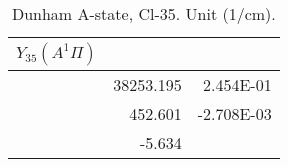 \begin{table}[h]
\begin{tabular}{crr}
\toprule
$Y_{35} (A^1\Pi)$\\ \midrule 
& 38253.195 & 2.454E-01 \\
& 452.601 & -2.708E-03 \\
& -5.634 \\
\bottomrule
\end{tabular}\caption{Dunham A-state, Cl-35. Unit (1/cm).}\end{table}
